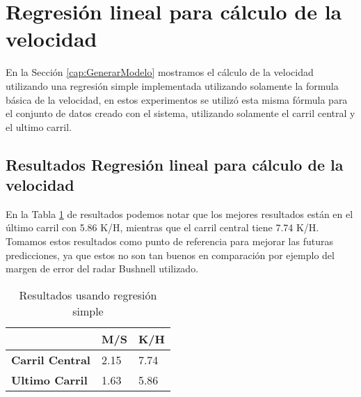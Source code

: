 \section{Regresión lineal para cálculo de la velocidad}

En la Sección \ref{cap:GenerarModelo} mostramos el cálculo de la velocidad utilizando una regresión simple implementada utilizando solamente la formula básica de la velocidad, en estos experimentos se utilizó esta misma fórmula para el conjunto de datos creado con el sistema, utilizando solamente el carril central y el ultimo carril.

\subsection{Resultados Regresión lineal para cálculo de la velocidad}

En la Tabla \ref{tab:resultadosRLS} de resultados podemos notar que los mejores resultados están en el último carril con 5.86 K/H, mientras que el carril central tiene 7.74 K/H. Tomamos estos resultados como punto de referencia para mejorar las futuras predicciones, ya que estos no son tan buenos en comparación por ejemplo del margen de error del radar Bushnell utilizado.

\begin{table}[H]
    \centering
    \caption{Resultados usando regresión simple}
    \label{tab:resultadosRLS}
    \begin{tabular}{|l|l|l|}
    \hline
    \textbf{} & \textbf{M/S} & \textbf{K/H} \\ \hline
    \textbf{Carril Central} & 2.15 & 7.74 \\ \hline
    \textbf{Ultimo Carril}  & 1.63 & 5.86 \\ \hline
    \end{tabular}
\end{table}
